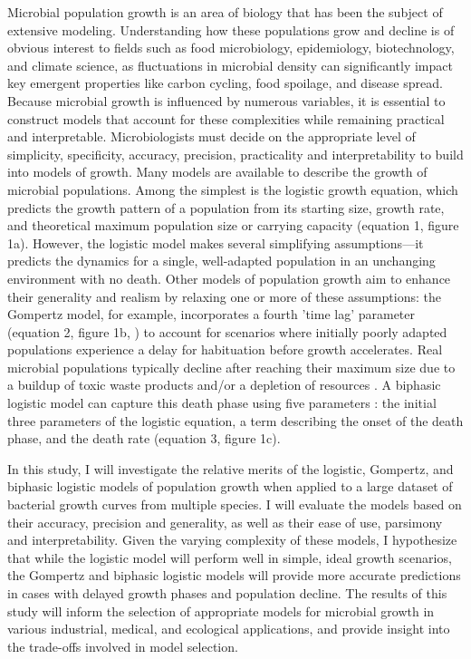 \documentclass{article}
\begin{document}
Microbial population growth is an area of biology that has been the subject of extensive modeling. Understanding how these populations grow and decline is of obvious interest to fields such as food microbiology, epidemiology, biotechnology, and climate science, as fluctuations in microbial density can significantly impact key emergent properties like carbon cycling, food spoilage, and disease spread. Because microbial growth is influenced by numerous variables, it is essential to construct models that account for these complexities while remaining practical and interpretable. Microbiologists must decide on the appropriate level of simplicity, specificity, accuracy, precision, practicality and interpretability to build into models of growth.
\newpage
Many models are available to describe the growth of microbial populations. Among the simplest is the logistic growth equation, which predicts the growth pattern of a population from its starting size, growth rate, and theoretical maximum population size or carrying capacity \cite{bradley2001} (equation 1, figure 1a). However, the logistic model makes several simplifying assumptions—it predicts the dynamics for a single, well-adapted population in an unchanging environment with no death. Other models of population growth aim to enhance their generality and realism by relaxing one or more of these assumptions: the Gompertz model, for example, incorporates a fourth 'time lag' parameter (equation 2, figure 1b, \cite{zwietering1990}) to account for scenarios where initially poorly adapted populations experience a delay for habituation before growth accelerates. Real microbial populations typically decline after reaching their maximum size due to a buildup of toxic waste products and/or a depletion of resources \cite{micha2011}. A biphasic logistic model can capture this death phase using five parameters \cite{beckon2008}: the initial three parameters of the logistic equation, a term describing the onset of the death phase, and the death rate (equation 3, figure 1c).

In this study, I will investigate the relative merits of the logistic, Gompertz, and biphasic logistic models of population growth when applied to a large dataset of bacterial growth curves from multiple species. I will evaluate the models based on their accuracy, precision and generality, as well as their ease of use, parsimony and interpretability. Given the varying complexity of these models, I hypothesize that while the logistic model will perform well in simple, ideal growth scenarios, the Gompertz and biphasic logistic models will provide more accurate predictions in cases with delayed growth phases and population decline. The results of this study will inform the selection of appropriate models for microbial growth in various industrial, medical, and ecological applications, and provide insight into the trade-offs involved in model selection.
\end{document}
